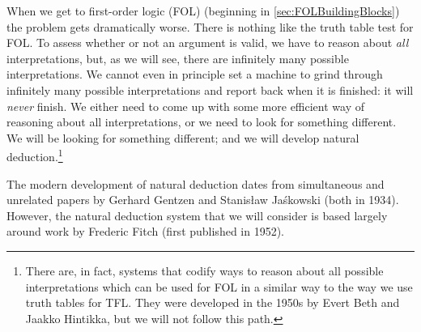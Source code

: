 When we get to first-order logic (FOL) (beginning in \cref{sec:FOLBuildingBlocks}) the problem gets dramatically worse. There is nothing like the truth table test for FOL. To assess whether or not an argument is valid, we have to reason about \emph{all} interpretations, but, as we will see, there are infinitely many possible interpretations. We cannot even in principle set a machine to grind through infinitely many possible interpretations and report back when it is finished: it will \emph{never} finish. We either need to come up with some more efficient way of reasoning about all interpretations, or we need to look for something different. We will be looking for something different; and we will develop natural deduction.\footnote{There are, in fact, systems that codify ways to reason about all possible interpretations which can be used for FOL in a similar way to the way we use truth tables for TFL. They were developed in the 1950s by Evert Beth and Jaakko Hintikka, but we will not follow this path.}
%
%
%



The modern development of natural deduction dates from simultaneous and unrelated papers by Gerhard Gentzen and Stanis\l{}aw Ja\'{s}kowski (both in 1934). However, the natural deduction system that we will consider is based largely around work by Frederic Fitch (first published in 1952).



